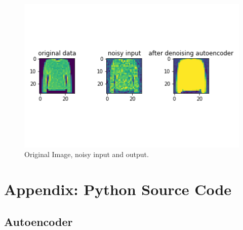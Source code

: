 \documentclass[11pt,a4paper,oneside]{article}
\begin{document}
\begin{figure}[!btp]
	\centering
	\includegraphics[width=.6\textwidth]{figures/save_ev_de_9}
	\caption{Original Image, noisy input and output.}
\end{figure}

\FloatBarrier

\newpage
\section{Appendix: Python Source Code}
\label{sec:app}

\subsection{Autoencoder}


\end{document}
